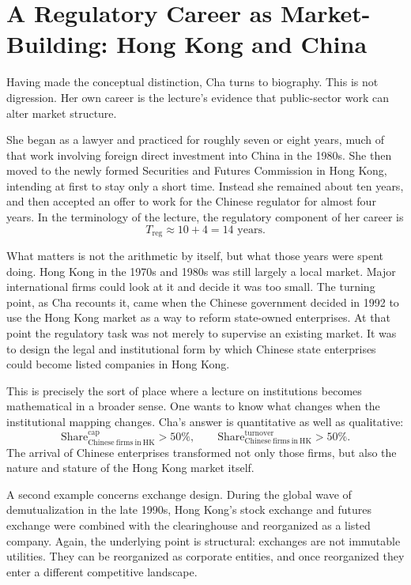 \section{A Regulatory Career as Market-Building: Hong Kong and China}

Having made the conceptual distinction, Cha turns to biography. This is not digression. Her own career is the lecture's evidence that public-sector work can alter market structure.

She began as a lawyer and practiced for roughly seven or eight years, much of that work involving foreign direct investment into China in the 1980s. She then moved to the newly formed Securities and Futures Commission in Hong Kong, intending at first to stay only a short time. Instead she remained about ten years, and then accepted an offer to work for the Chinese regulator for almost four years. In the terminology of the lecture, the regulatory component of her career is
\begin{equation}
T_{\mathrm{reg}} \approx 10 + 4 = 14 \text{ years.}
\end{equation}

What matters is not the arithmetic by itself, but what those years were spent doing. Hong Kong in the 1970s and 1980s was still largely a local market. Major international firms could look at it and decide it was too small. The turning point, as Cha recounts it, came when the Chinese government decided in 1992 to use the Hong Kong market as a way to reform state-owned enterprises. At that point the regulatory task was not merely to supervise an existing market. It was to design the legal and institutional form by which Chinese state enterprises could become listed companies in Hong Kong.

This is precisely the sort of place where a lecture on institutions becomes mathematical in a broader sense. One wants to know what changes when the institutional mapping changes. Cha's answer is quantitative as well as qualitative:
\begin{equation}
\mathrm{Share}^{\mathrm{cap}}_{\mathrm{Chinese\ firms\ in\ HK}} > 50\%,
\qquad
\mathrm{Share}^{\mathrm{turnover}}_{\mathrm{Chinese\ firms\ in\ HK}} > 50\%.
\end{equation}
The arrival of Chinese enterprises transformed not only those firms, but also the nature and stature of the Hong Kong market itself.

A second example concerns exchange design. During the global wave of demutualization in the late 1990s, Hong Kong's stock exchange and futures exchange were combined with the clearinghouse and reorganized as a listed company. Again, the underlying point is structural: exchanges are not immutable utilities. They can be reorganized as corporate entities, and once reorganized they enter a different competitive landscape.

